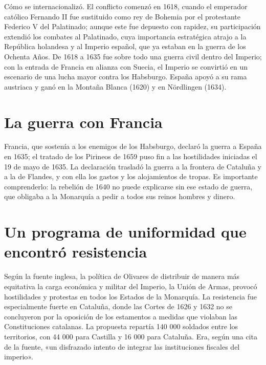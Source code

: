 \documentclass{book}
\begin{document}

Cómo se internacionalizó. El conflicto comenzó en 1618, cuando el emperador católico Fernando II fue sustituido como rey de Bohemia por el protestante Federico V del Palatinado; aunque este fue depuesto con rapidez, su participación extendió los combates al Palatinado, cuya importancia estratégica atrajo a la República holandesa y al Imperio español, que ya estaban en la guerra de los Ochenta Años. De 1618 a 1635 fue sobre todo una guerra civil dentro del Imperio; con la entrada de Francia en alianza con Suecia, el Imperio se convirtió en un escenario de una lucha mayor contra los Habsburgo. España apoyó a su rama austriaca y ganó en la Montaña Blanca (1620) y en Nördlingen (1634).


\section{La guerra con Francia}

Francia, que sostenía a los enemigos de los Habsburgo, declaró la guerra a España en 1635; el tratado de los Pirineos de 1659 puso fin a las hostilidades iniciadas el 19 de mayo de 1635. La declaración trasladó la guerra a la frontera de Cataluña y a la de Flandes, y con ella los gastos y los alojamientos de tropas. Es importante comprenderlo: la rebelión de 1640 no puede explicarse sin ese estado de guerra, que obligaba a la Monarquía a pedir a todos sus reinos hombres y dinero.


\section{Un programa de uniformidad que encontró resistencia}

Según la fuente inglesa, la política de Olivares de distribuir de manera más equitativa la carga económica y militar del Imperio, la Unión de Armas, provocó hostilidades y protestas en todos los Estados de la Monarquía. La resistencia fue especialmente fuerte en Cataluña, donde las Cortes de 1626 y 1632 no se concluyeron por la oposición de los estamentos a medidas que violaban las Constituciones catalanas. La propuesta repartía 140 000 soldados entre los territorios, con 44 000 para Castilla y 16 000 para Cataluña. Era, según una cita de la fuente, «un disfrazado intento de integrar las instituciones fiscales del imperio».
\end{document}
